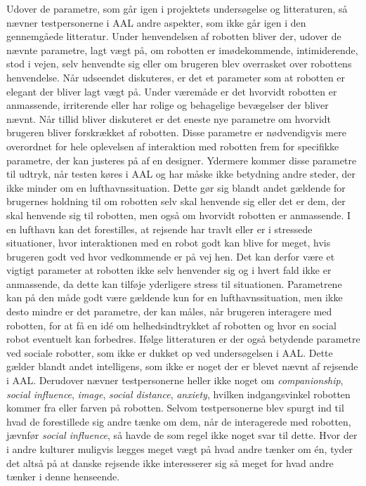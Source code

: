 Udover de parametre, som går igen i projektets undersøgelse og litteraturen, så nævner testpersonerne i AAL andre aspekter, som ikke går igen i den gennemgåede litteratur. Under henvendelsen af robotten bliver der, udover de nævnte parametre, lagt vægt på, om robotten er imødekommende, intimiderende, stod i vejen, selv henvendte sig eller om brugeren blev overrasket over robottens henvendelse. Når udseendet diskuteres, er det et parameter som at robotten er elegant der bliver lagt vægt på. Under væremåde er det hvorvidt robotten er anmassende, irriterende eller har rolige og behagelige bevægelser der bliver nævnt. Når tillid bliver diskuteret er det eneste nye parametre om hvorvidt brugeren bliver forskrækket af robotten. Disse parametre er nødvendigvis mere overordnet for hele oplevelsen af interaktion med robotten frem for specifikke parametre, der kan justeres på af en designer. Ydermere kommer disse parametre til udtryk, når testen køres i AAL og har måske ikke betydning andre steder, der ikke minder om en lufthavnssituation. Dette gør sig blandt andet gældende for brugernes holdning til om robotten selv skal henvende sig eller det er dem, der skal henvende sig til robotten, men også om hvorvidt robotten er anmassende. I en lufthavn kan det forestilles, at rejsende har travlt eller er i stressede situationer, hvor interaktionen med en robot godt kan blive for meget, hvis brugeren godt ved hvor vedkommende er på vej hen. Det kan derfor være et vigtigt parameter at robotten ikke selv henvender sig og i hvert fald ikke er anmassende, da dette kan tilføje yderligere stress til situationen. Parametrene kan på den måde godt være gældende kun for en lufthavnssituation, men ikke desto mindre er det parametre, der kan måles, når brugeren interagere med robotten, for at få en idé om helhedsindtrykket af robotten og hvor en social robot eventuelt kan forbedres. \blankline
%
Ifølge litteraturen er der også betydende parametre ved sociale robotter, som ikke er dukket op ved undersøgelsen i AAL. Dette gælder blandt andet intelligens, som ikke er noget der er blevet nævnt af rejsende i AAL. Derudover nævner testpersonerne heller ikke noget om \textit{companionship}, \textit{social influence}, \textit{image}, \textit{social distance}, \textit{anxiety}, hvilken indgangsvinkel robotten kommer fra eller farven på robotten. Selvom testpersonerne blev spurgt ind til hvad de forestillede sig andre tænke om dem, når de interagerede med robotten, jævnfør \textit{social influence}, så havde de som regel ikke noget svar til dette. Hvor der i andre kulturer muligvis lægges meget vægt på hvad andre tænker om én, tyder det altså på at danske rejsende ikke interesserer sig så meget for hvad andre tænker i denne henseende. \blankline
